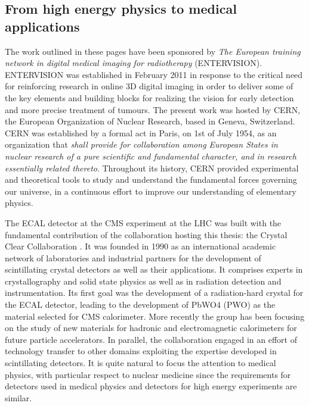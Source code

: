\subsection{From high energy physics to medical applications}
The work outlined in these pages have been sponsored by \textit{The European training network in digital medical imaging for radiotherapy} (ENTERVISION). ENTERVISION was established in February 2011 in response to the critical need for reinforcing research in online 3D digital imaging in order to deliver some of the key elements and building blocks for realizing the vision for early detection and more precise treatment of tumours.
The present work was hosted by CERN, the European Organization of Nuclear Research, based in Geneva, Switzerland. 
CERN was established by a formal act in Paris, on 1st of July 1954, as an organization that \textit{shall provide for collaboration among European States in nuclear research of a pure scientific and fundamental character, and in research essentially related thereto}.
Throughout its history, CERN provided experimental and theoretical tools to study and understand the fundamental forces governing our universe, in a continuous effort to improve our understanding of elementary  physics. 

The ECAL detector at the CMS experiment at the LHC was built with the fundamental contribution of the collaboration hosting this thesis: the Crystal Clear Collaboration \cite{CCC}. It was founded in 1990 as an international academic network of laboratories and industrial partners for the development of scintillating crystal detectors as well as their applications. It comprises experts in crystallography and solid state physics as well as in radiation detection and instrumentation. 
Its first goal was the development of a radiation-hard crystal for the ECAL detector, leading to the development of PbWO4 (PWO) as the material selected for CMS calorimeter. More recently the group has been focusing on the study of new materials for hadronic and electromagnetic calorimeters for future particle accelerators.
In parallel, the collaboration engaged in an effort of technology transfer to other domains exploiting the expertise developed in scintillating detectors. It is quite natural to focus the attention to medical physics, with particular respect to nuclear medicine since the requirements for detectors used in medical physics and detectors for high energy experiments are similar.


